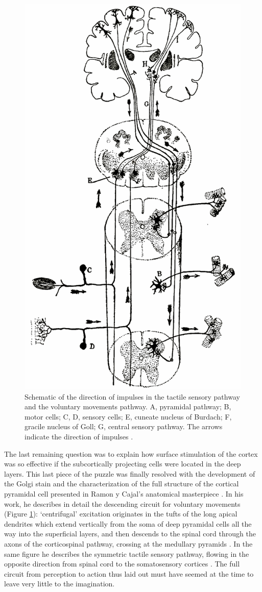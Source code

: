 \begin{figure}
\begin{center}
\includegraphics[width=0.65\columnwidth]{chapters/figuresChTeleology/cajalPathway}
\end{center}
\vspace{-5mm}
\caption{Schematic of the direction of impulses in the tactile sensory pathway and the voluntary movements pathway. A, pyramidal pathway; B, motor cells; C, D, sensory cells; E, cuneate nucleus of Burdach; F, gracile nucleus of Goll; G, central sensory pathway. The arrows indicate the direction of impulses \protect\cite[p.540]{RamonYCajal1909}.}
\label{fig:cajalPathway}
\end{figure}

The last remaining question was to explain how surface stimulation of the cortex was so effective if the subcortically projecting cells were located in the deep layers. This last piece of the puzzle was finally resolved with the development of the Golgi stain and the characterization of the full structure of the cortical pyramidal cell presented in Ramon y Cajal's anatomical masterpiece \cite{RamonYCajal1894,RamonYCajal1909}. In his work, he describes in detail the descending circuit for voluntary movements (Figure \ref{fig:cajalPathway}): ‘centrifugal’ excitation originates in the tufts of the long apical dendrites which extend vertically from the soma of deep pyramidal cells all the way into the superficial layers, and then descends to the spinal cord through the axons of the corticospinal pathway, crossing at the medullary pyramids \cite{RamonYCajal1909}. In the same figure he describes the symmetric tactile sensory pathway, flowing in the opposite direction from spinal cord to the somatosensory cortices \cite{RamonYCajal1909}. The full circuit from perception to action thus laid out must have seemed at the time to leave very little to the imagination.

